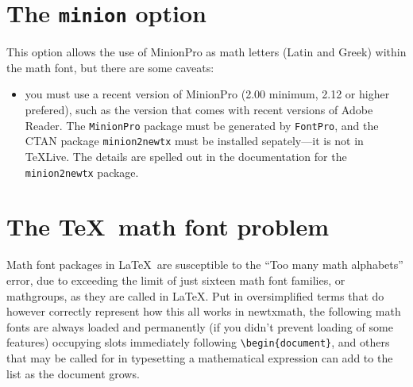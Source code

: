 \documentclass[11pt]{article}
\theoremstyle{oldplain}
\theoremstyle{plain}
\begin{document}
\section{The {\tt minion} option}
This option allows the use of MinionPro as math letters (Latin and Greek) within  the math font, but there are some caveats:
\begin{itemize}
\item
you must use a recent version of MinionPro (2.00 minimum, 2.12 or higher prefered), such as the version that comes with recent versions of Adobe Reader. The {\tt MinionPro} package must be generated by {\tt FontPro}, and the CTAN package {\tt minion2newtx} must be installed sepately---it is not in \TeX Live. The details are spelled out in the documentation for the {\tt minion2newtx} package.
\end{itemize}

\section{The \TeX\ math font problem}
Math font packages in \LaTeX\ are susceptible to the ``Too many math alphabets'' error, due to exceeding the limit of just sixteen math font families, or mathgroups, as they are called in \LaTeX. Put in oversimplified terms that do however correctly represent how this all works in \textsf{newtxmath}, the following math fonts are always loaded and permanently (if you didn't prevent loading of some features) occupying slots immediately following \verb|\begin{document}|, and others that may be called for in typesetting a mathematical expression can add to the list as the document grows.
\end{document}
